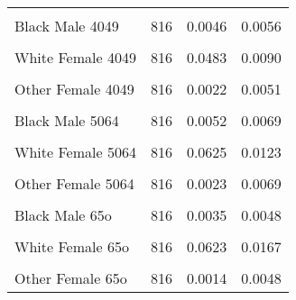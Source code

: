 \begin{table}[H]
\begin{tabular}[t]{lrrr}
\cellcolor{gray!6}{White Male 4049} & \cellcolor{gray!6}{816} & \cellcolor{gray!6}{0.0480} & \cellcolor{gray!6}{0.0091}\\
Black Male 4049 & 816 & 0.0046 & 0.0056\\
\addlinespace
\cellcolor{gray!6}{Other Male 4049} & \cellcolor{gray!6}{816} & \cellcolor{gray!6}{0.0020} & \cellcolor{gray!6}{0.0047}\\
White Female 4049 & 816 & 0.0483 & 0.0090\\
\cellcolor{gray!6}{Black Female 4049} & \cellcolor{gray!6}{816} & \cellcolor{gray!6}{0.0055} & \cellcolor{gray!6}{0.0068}\\
Other Female 4049 & 816 & 0.0022 & 0.0051\\
\cellcolor{gray!6}{White Male 5064} & \cellcolor{gray!6}{816} & \cellcolor{gray!6}{0.0580} & \cellcolor{gray!6}{0.0105}\\
\addlinespace
Black Male 5064 & 816 & 0.0052 & 0.0069\\
\cellcolor{gray!6}{Other Male 5064} & \cellcolor{gray!6}{816} & \cellcolor{gray!6}{0.0019} & \cellcolor{gray!6}{0.0061}\\
White Female 5064 & 816 & 0.0625 & 0.0123\\
\cellcolor{gray!6}{Black Female 5064} & \cellcolor{gray!6}{816} & \cellcolor{gray!6}{0.0065} & \cellcolor{gray!6}{0.0089}\\
Other Female 5064 & 816 & 0.0023 & 0.0069\\
\addlinespace
\cellcolor{gray!6}{White Male 65o} & \cellcolor{gray!6}{816} & \cellcolor{gray!6}{0.0426} & \cellcolor{gray!6}{0.0114}\\
Black Male 65o & 816 & 0.0035 & 0.0048\\
\cellcolor{gray!6}{Other Male 65o} & \cellcolor{gray!6}{816} & \cellcolor{gray!6}{0.0012} & \cellcolor{gray!6}{0.0046}\\
White Female 65o & 816 & 0.0623 & 0.0167\\
\cellcolor{gray!6}{Black Female 65o} & \cellcolor{gray!6}{816} & \cellcolor{gray!6}{0.0054} & \cellcolor{gray!6}{0.0078}\\
\addlinespace
Other Female 65o & 816 & 0.0014 & 0.0048\\
\bottomrule
\end{tabular}
\end{table}
